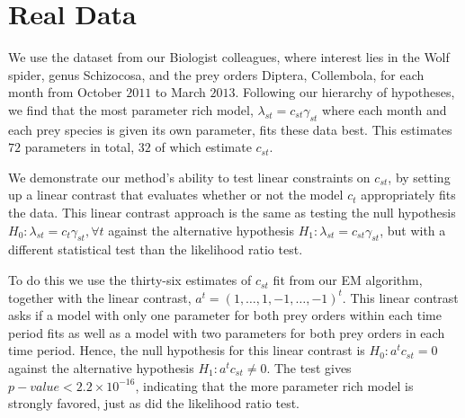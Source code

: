 \section{Real Data}
\label{sec:data}

We use the dataset from {\color{red} our Biologist colleagues}, where interest lies in the Wolf spider, genus Schizocosa, and the prey orders Diptera, Collembola, for each month from October $2011$ to March $2013$.  Following our hierarchy of hypotheses, we find that the most parameter rich model, $\lambda_{st} = c_{st} \gamma_{st}$ where each month and each prey species is given its own parameter, fits these data best.  This estimates $72$ parameters in total, $32$ of which estimate $c_{st}$.

We demonstrate our method's ability to test linear constraints on $c_{st}$, by setting up a linear contrast that evaluates whether or not the model $c_t$ appropriately fits the data.  This linear contrast approach is the same as testing the null hypothesis $H_0: \lambda_{st} = c_t \gamma_{st}, \forall t$ against the alternative hypothesis $H_1: \lambda_{st} = c_{st} \gamma_{st}$, but with a different statistical test than the likelihood ratio test.  

To do this we use the thirty-six estimates of $c_{st}$ fit from our EM algorithm, together with the linear contrast, $a^t = (1, \ldots, 1, -1, \ldots, -1)^t$.  This linear contrast asks if a model with only one parameter for both prey orders within each time period fits as well as a model with two parameters for both prey orders in each time period.  Hence, the null hypothesis for this linear contrast is $H_0: a^tc_{st} = 0$ against the alternative hypothesis $H_1: a^tc_{st} \ne 0$.  The test gives $p-value < 2.2\times 10^{-16}$, indicating that the more parameter rich model is strongly favored, just as did the likelihood ratio test.


